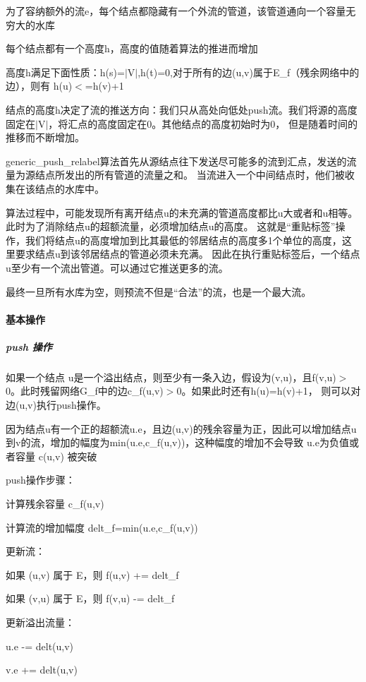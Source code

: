 \begin{DoxyItemize}
\item 为了容纳额外的流e，每个结点都隐藏有一个外流的管道，该管道通向一个容量无穷大的水库
\item 每个结点都有一个高度h，高度的值随着算法的推进而增加
\end{DoxyItemize}

高度h满足下面性质：h(s)=$\vert$\+V$\vert$,h(t)=0,对于所有的边(u,v)属于\+E\+\_\+f（残余网络中的边），则有 h(u)$<$=h(v)+1

结点的高度h决定了流的推送方向：我们只从高处向低处push流。我们将源的高度固定在$\vert$\+V$\vert$，将汇点的高度固定在0。其他结点的高度初始时为0， 但是随着时间的推移而不断增加。

generic\+\_\+push\+\_\+relabel算法首先从源结点往下发送尽可能多的流到汇点，发送的流量为源结点所发出的所有管道的流量之和。 当流进入一个中间结点时，他们被收集在该结点的水库中。

算法过程中，可能发现所有离开结点u的未充满的管道高度都比u大或者和u相等。此时为了消除结点u的超额流量，必须增加结点u的高度。 这就是“重贴标签”操作，我们将结点u的高度增加到比其最低的邻居结点的高度多1个单位的高度，这里要求结点u到该邻居结点的管道必须未充满。 因此在执行重贴标签后，一个结点u至少有一个流出管道。可以通过它推送更多的流。

最终一旦所有水库为空，则预流不但是“合法”的流，也是一个最大流。

\paragraph*{基本操作}

\subparagraph*{push 操作}

如果一个结点 u是一个溢出结点，则至少有一条入边，假设为(v,u)，且f(v,u)$>$0。此时残留网络\+G\+\_\+f中的边c\+\_\+f(u,v)$>$0。如果此时还有h(u)=h(v)+1， 则可以对边(u,v)执行push操作。

因为结点u有一个正的超额流u.\+e，且边(u,v)的残余容量为正，因此可以增加结点u到v的流，增加的幅度为min(u.\+e,c\+\_\+f(u,v))，这种幅度的增加不会导致 u.\+e为负值或者容量 c(u,v) 被突破

push操作步骤：


\begin{DoxyItemize}
\item 计算残余容量 c\+\_\+f(u,v)
\item 计算流的增加幅度 delt\+\_\+f=min(u.\+e,c\+\_\+f(u,v))
\item 更新流：
\begin{DoxyItemize}
\item 如果 (u,v) 属于 E，则 f(u,v) += delt\+\_\+f
\item 如果 (v,u) 属于 E，则 f(v,u) -\/= delt\+\_\+f
\end{DoxyItemize}
\item 更新溢出流量：
\begin{DoxyItemize}
\item u.\+e -\/= delt(u,v)
\item v.\+e += delt(u,v)
\end{DoxyItemize}
\end{DoxyItemize}

